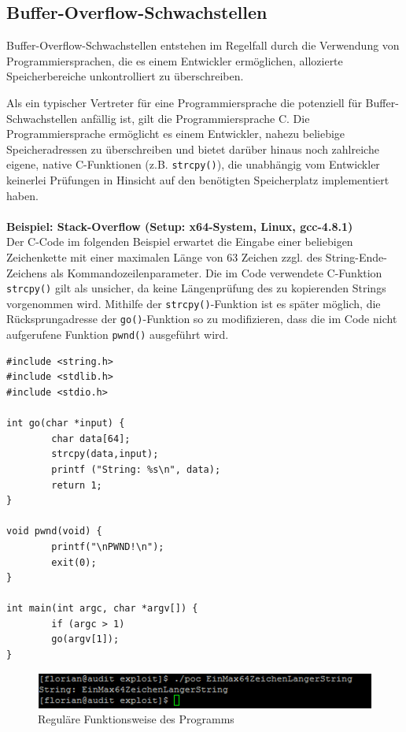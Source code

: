 \subsection{Buffer-Overflow-Schwachstellen}	

Buffer-Overflow-Schwachstellen entstehen im Regelfall durch die 
Verwendung von Programmiersprachen, die es einem Entwickler ermöglichen, 
allozierte Speicherbereiche unkontrolliert zu überschreiben.

\par\medskip 
Als ein typischer Vertreter für eine Programmiersprache die potenziell 
für Buffer-Schwachstellen anfällig ist, gilt die Programmiersprache C. 
Die Programmiersprache ermöglicht es einem Entwickler, nahezu beliebige 
Speicheradressen zu überschreiben und bietet darüber hinaus noch 
zahlreiche eigene, native C-Funktionen (z.B. \texttt{strcpy()}), die 
unabhängig vom Entwickler keinerlei Prüfungen in Hinsicht auf den 
benötigten Speicherplatz implementiert haben.
\\\\
\textbf{Beispiel: Stack-Overflow (Setup: x64-System, Linux, gcc-4.8.1)}
\\
Der C-Code im folgenden Beispiel erwartet die Eingabe einer beliebigen 
Zeichenkette mit einer maximalen Länge von 63 Zeichen zzgl. 
des String-Ende-Zeichens als Kommandozeilenparameter. 
Die im Code verwendete C-Funktion \texttt{strcpy()} gilt als unsicher, 
da keine Längenprüfung des zu kopierenden Strings vorgenommen wird. 
Mithilfe der \texttt{strcpy()}-Funktion ist es später möglich, die 
Rücksprungadresse der \texttt{go()}-Funktion so zu modifizieren, dass 
die im Code nicht aufgerufene Funktion \texttt{pwnd()} ausgeführt wird.

\begin{lstlisting}[basicstyle=\ttfamily\footnotesize]
#include <string.h>
#include <stdlib.h>
#include <stdio.h>

int go(char *input) {
        char data[64];
        strcpy(data,input);
        printf ("String: %s\n", data);
        return 1;
}

void pwnd(void) {
        printf("\nPWND!\n");
        exit(0);
}

int main(int argc, char *argv[]) {
        if (argc > 1)
        go(argv[1]);
}
\end{lstlisting}

\begin{figure}[htbp]
 \centering
 \includegraphics[scale=.5]{abbildungen/poc_1}
 \caption{Reguläre Funktionsweise des Programms}
 \label{fig:poc_1} 
\end{figure}

